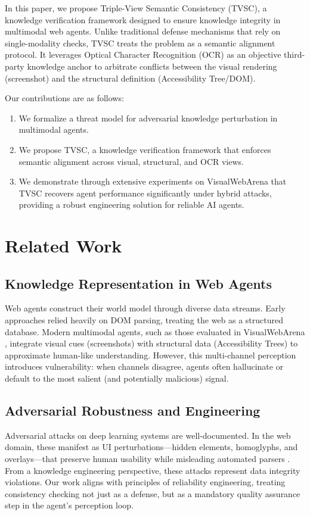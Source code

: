 \documentclass[runningheads]{llncs}
\begin{document}
In this paper, we propose Triple-View Semantic Consistency (TVSC), a knowledge verification framework designed to ensure knowledge integrity in multimodal web agents. Unlike traditional defense mechanisms that rely on single-modality checks, TVSC treats the problem as a semantic alignment protocol. It leverages Optical Character Recognition (OCR) as an objective third-party knowledge anchor to arbitrate conflicts between the visual rendering (screenshot) and the structural definition (Accessibility Tree/DOM).

Our contributions are as follows:
\begin{enumerate}
    \item We formalize a threat model for adversarial knowledge perturbation in multimodal agents.
    \item We propose TVSC, a knowledge verification framework that enforces semantic alignment across visual, structural, and OCR views.
    \item We demonstrate through extensive experiments on VisualWebArena that TVSC recovers agent performance significantly under hybrid attacks, providing a robust engineering solution for reliable AI agents.
\end{enumerate}

\section{Related Work}
\subsection{Knowledge Representation in Web Agents}
Web agents construct their world model through diverse data streams. Early approaches relied heavily on DOM parsing, treating the web as a structured database. Modern multimodal agents, such as those evaluated in VisualWebArena \cite{visualwebarena}, integrate visual cues (screenshots) with structural data (Accessibility Trees) to approximate human-like understanding. However, this multi-channel perception introduces vulnerability: when channels disagree, agents often hallucinate or default to the most salient (and potentially malicious) signal.

\subsection{Adversarial Robustness and Engineering}
Adversarial attacks on deep learning systems are well-documented. In the web domain, these manifest as UI perturbations---hidden elements, homoglyphs, and overlays---that preserve human usability while misleading automated parsers \cite{webarena}. From a knowledge engineering perspective, these attacks represent data integrity violations. Our work aligns with principles of reliability engineering, treating consistency checking not just as a defense, but as a mandatory quality assurance step in the agent's perception loop.
\end{document}
